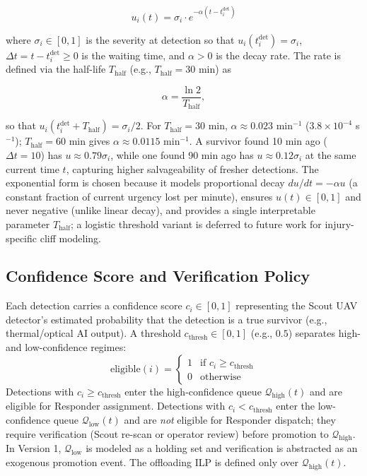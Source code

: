 \documentclass[conference]{IEEEtran}
\begin{document}
\begin{equation}
u_i(t) = \sigma_i \cdot e^{-\alpha (t - t_i^{\text{det}})}
\label{eq:urgency}
\end{equation}

where $\sigma_i \in[0,1]$ is the severity at detection so that $u_i(t_i^{\text{det}})=\sigma_i$, $\Delta t = t - t_i^{\text{det}} \geq 0$ is the waiting time, and $\alpha>0$ is the decay rate. The rate is defined via the half-life $T_{\text{half}}$ (e.g., $T_{\text{half}}=30$ min) as

\begin{equation}
\alpha = \frac{\ln 2}{T_{\text{half}}},
\end{equation}

so that $u_i(t_i^{\text{det}}+T_{\text{half}})=\sigma_i/2$. For $T_{\text{half}}=30$ min, $\alpha \approx 0.023$ min$^{-1}$ ($3.8\times10^{-4}$ s$^{-1}$); $T_{\text{half}}=60$ min gives $\alpha\approx0.0115$ min$^{-1}$. A survivor found 10 min ago ($\Delta t=10$) has $u\approx0.79\sigma_i$, while one found 90 min ago has $u\approx0.12\sigma_i$ at the same current time $t$, capturing higher salvageability of fresher detections. The exponential form is chosen because it models proportional decay $du/dt=-\alpha u$ (a constant fraction of current urgency lost per minute), ensures $u(t)\in[0,1]$ and never negative (unlike linear decay), and provides a single interpretable parameter $T_{\text{half}}$; a logistic threshold variant is deferred to future work for injury-specific cliff modeling.

\subsection{Confidence Score and Verification Policy}
Each detection carries a confidence score $c_i \in [0,1]$ representing the Scout UAV detector's estimated probability that the detection is a true survivor (e.g., thermal/optical AI output). A threshold $c_{\text{thresh}} \in [0,1]$ (e.g., $0.5$) separates high- and low-confidence regimes:
\begin{equation}
\text{eligible}(i) = \begin{cases}
1 & \text{if } c_i \geq c_{\text{thresh}} \\
0 & \text{otherwise}
\end{cases}
\end{equation}
Detections with $c_i \geq c_{\text{thresh}}$ enter the high-confidence queue $\mathcal{Q}_{\text{high}}(t)$ and are eligible for Responder assignment. Detections with $c_i < c_{\text{thresh}}$ enter the low-confidence queue $\mathcal{Q}_{\text{low}}(t)$ and are \textit{not} eligible for Responder dispatch; they require verification (Scout re-scan or operator review) before promotion to $\mathcal{Q}_{\text{high}}$. In Version 1, $\mathcal{Q}_{\text{low}}$ is modeled as a holding set and verification is abstracted as an exogenous promotion event. The offloading ILP is defined only over $\mathcal{Q}_{\text{high}}(t)$.
\end{document}
